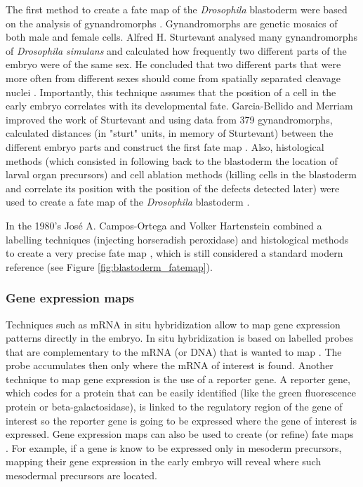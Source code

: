 The first method to create a fate map of the \textit{Drosophila} blastoderm were based on the analysis of gynandromorphs \citep{Janning1978}. Gynandromorphs are genetic mosaics of both male and female cells.
Alfred H. Sturtevant analysed many gynandromorphs of \textit{Drosophila simulans} and calculated how frequently two different parts of the embryo were of the same sex. He concluded that two different parts that were more often from different sexes should come from spatially separated cleavage nuclei \citep{Janning1978}. 
Importantly, this technique assumes that the position of a cell in the early embryo correlates with its developmental fate.
Garcia-Bellido and Merriam improved the work of Sturtevant and using data from 379 gynandromorphs, calculated distances (in "sturt" units, in memory of Sturtevant) between the different embryo parts and construct the first fate map \citep{Garcia-Bellido1969}.
Also, histological methods (which consisted in following back to the blastoderm the location of larval organ precursors) and cell ablation methods (killing cells in the blastoderm and correlate its position with the position of the defects detected later) were used to create a fate map of the \textit{Drosophila} blastoderm \citep{Campos-Ortega1985}.

In the 1980's Jos\'{e} A. Campos-Ortega and Volker Hartenstein combined a labelling techniques (injecting horseradish peroxidase) and histological methods to create a very precise fate map \citep{Campos-Ortega1985}, which is still considered a standard modern reference (see Figure \ref{fig:blastoderm_fatemap}).

\subsubsection{Gene expression maps}

Techniques such as mRNA in situ hybridization allow to map gene expression patterns directly in the embryo. In situ hybridization is based on labelled probes that are complementary to the mRNA (or DNA) that is wanted to map \citep{Gall1969}. The probe accumulates then only where the mRNA of interest is found.
Another technique to map gene expression is the use of a reporter gene. A reporter gene, which codes for a protein that can be easily identified (like the green fluorescence protein or beta-galactosidase), is linked to the regulatory region of the gene of interest so the reporter gene is going to be expressed where the gene of interest is expressed.
Gene expression maps can also be used to create (or refine) fate maps \citep{gilbert2007fatemap}. 
For example, if a gene is know to be expressed only in mesoderm precursors, mapping their gene expression in the early embryo will reveal where such mesodermal precursors are located.

